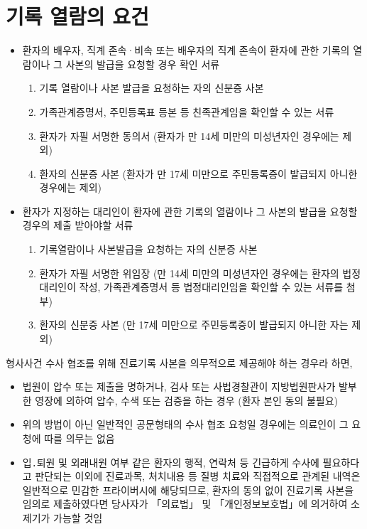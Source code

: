 \section{기록 열람의 요건}
\begin{itemize}[-]\tightlist
\item  환자의 배우자, 직계 존속·비속 또는 배우자의 직계 존속이 환자에 관한 기록의 열람이나 그 사본의 발급을 요청할 경우 확인 서류
	\begin{enumerate}\tightlist	
	\item 기록 열람이나 사본 발급을 요청하는 자의 신분증 사본
	\item 가족관계증명서, 주민등록표 등본 등 친족관계임을 확인할 수 있는 서류
	\item 환자가 자필 서명한 동의서 (환자가 만 14세 미만의 미성년자인 경우에는 제외)
	\item 환자의 신분증 사본 (환자가 만 17세 미만으로 주민등록증이 발급되지 아니한 경우에는 제외)
	\end{enumerate}
\item  환자가 지정하는 대리인이 환자에 관한 기록의 열람이나 그 사본의 발급을 요청할 경우의 제출 받아야할 서류
	\begin{enumerate}\tightlist	
	\item 기록열람이나 사본발급을 요청하는 자의 신분증 사본
	\item 환자가 자필 서명한 위임장 (만 14세 미만의 미성년자인 경우에는 환자의 법정대리인이 작성, 가족관계증명서 등 법정대리인임을 확인할 수 있는 서류를 첨부)
	\item 환자의 신분증 사본 (만 17세 미만으로 주민등록증이 발급되지 아니한 자는 제외)
	\end{enumerate}
\end{itemize}
형사사건 수사 협조를 위해 진료기록 사본을 의무적으로 제공해야 하는 경우라 하면,
\begin{itemize}[-]\tightlist
\item 법원이 압수 또는 제출을 명하거나, 검사 또는 사법경찰관이 지방법원판사가 발부한 영장에 의하여 압수, 수색 또는 검증을 하는 경우 (환자 본인 동의 불필요) 
\item 위의 방법이 아닌 일반적인 공문형태의 수사 협조 요청일 경우에는 의료인이 그 요청에 따를 의무는 없음
\item 입․퇴원 및 외래내원 여부 같은 환자의 행적, 연락처 등 긴급하게 수사에 필요하다고 판단되는 이외에 진료과목, 처치내용 등 질병 치료와 직접적으로 관계된 내역은 일반적으로 민감한 프라이버시에 해당되므로, 환자의 동의 없이 진료기록 사본을 임의로 제출하였다면 당사자가 「의료법」 및 「개인정보보호법」에 의거하여 소제기가 가능할 것임
\end{itemize}

